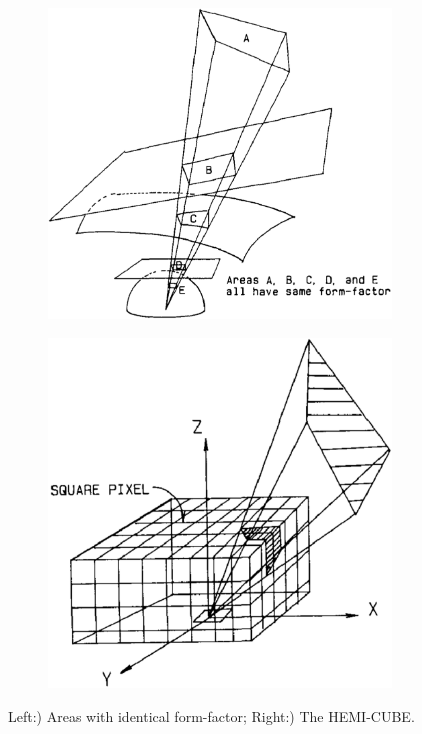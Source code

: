 \begin{figure}\label{f:hemicube}
	\begin{subfigure}[b]{0.54\textwidth}
		\includegraphics[width=1.0\textwidth]{graphics/gi/path-22-1}
	\end{subfigure}
	\begin{subfigure}[b]{0.45\textwidth}
		\includegraphics[width=1.0\textwidth]{graphics/gi/path-22-2}
	\end{subfigure}
	\caption{Left:) Areas with identical form-factor; Right:) The HEMI-CUBE.}
\end{figure}

